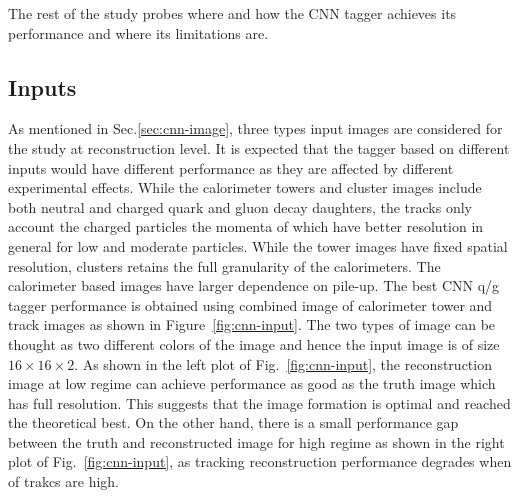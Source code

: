 The rest of the study probes where and how the CNN tagger achieves its performance and where its limitations are.

\subsection{Inputs}

As mentioned in Sec.\ref{sec:cnn-image}, three types input images are considered for the study at reconstruction level.
It is expected that the tagger based on different inputs would have different performance as they are affected
by different experimental effects. While the calorimeter towers and cluster images include both neutral and charged quark
and gluon decay daughters, the tracks only account the charged particles the momenta of which have better resolution
in general for low and moderate \pt particles. While the tower images have fixed spatial resolution,
clusters retains the full granularity of the calorimeters. The calorimeter based images have larger dependence on pile-up.
The best CNN q/g tagger performance is obtained using combined image of calorimeter tower and track images as shown in
Figure~\ref{fig:cnn-input}.
The two types of image can be thought as two different colors of the image and hence the input image is of size $16\times 16\times 2$.
As shown in the left plot of Fig.~\ref{fig:cnn-input}, the reconstruction image at low \pt regime can achieve performance as good as
the truth image which has full resolution. This suggests that the image formation is optimal and reached the theoretical best. On the other hand,
there is a small performance gap between the truth and reconstructed image for high \pt regime as shown in the right plot of Fig.~\ref{fig:cnn-input},
as tracking reconstruction performance degrades when \pt of trakcs are high. 

